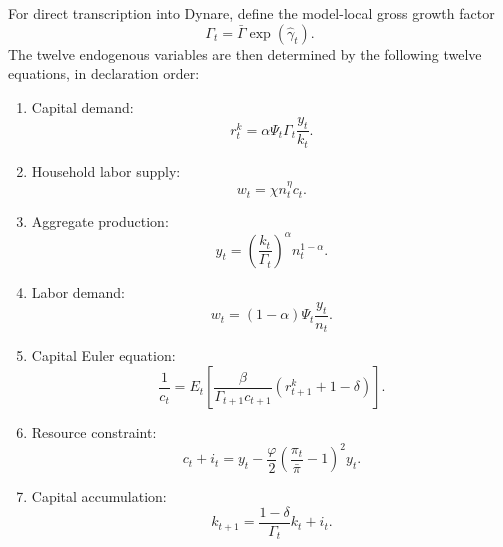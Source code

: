 \documentclass[12pt,final]{article}
\begin{document}
For direct transcription into Dynare, define the model-local gross growth factor
\begin{equation*}
  \Gamma_t=\bar\Gamma\exp(\widehat\gamma_t).
\end{equation*}
The twelve endogenous variables are then determined by the following twelve
equations, in declaration order:
\begin{enumerate}[label=\arabic*.,leftmargin=2.4em]
  \item Capital demand:
        \begin{equation*}
          r_t^k=\alpha\Psi_t\Gamma_t\frac{y_t}{k_t}.
        \end{equation*}

  \item Household labor supply:
        \begin{equation*}
          w_t=\chi n_t^\eta c_t.
        \end{equation*}

  \item Aggregate production:
        \begin{equation*}
          y_t=\left(\frac{k_t}{\Gamma_t}\right)^\alpha n_t^{1-\alpha}.
        \end{equation*}

  \item Labor demand:
        \begin{equation*}
          w_t=(1-\alpha)\Psi_t\frac{y_t}{n_t}.
        \end{equation*}

  \item Capital Euler equation:
        \begin{equation*}
          \frac{1}{c_t}
          =E_t\left[
          \frac{\beta}{\Gamma_{t+1}c_{t+1}}
          \left(r_{t+1}^k+1-\delta\right)
          \right].
        \end{equation*}

  \item Resource constraint:
        \begin{equation*}
          c_t+i_t
          =y_t-\frac{\varphi}{2}
          \left(\frac{\pi_t}{\bar\pi}-1\right)^2y_t.
        \end{equation*}

  \item Capital accumulation:
        \begin{equation*}
          k_{t+1}=\frac{1-\delta}{\Gamma_t}k_t+i_t.
        \end{equation*}


\end{enumerate}
\end{document}
